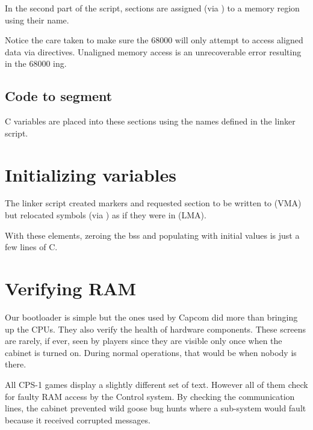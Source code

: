 

In the second part of the script, sections are assigned (via \textbf{\red{\textgreater}}) to a memory region using their  name.

\begin{trivia}
Notice the care taken to make sure the 68000 will only attempt to access aligned data via  directives. Unaligned memory access is an unrecoverable error resulting in the 68000 ing.
\end{trivia}


\subsection{Code to segment}

C variables are placed into these sections using the names defined in the linker script.





\section{Initializing variables}
The linker script created markers and requested section  to be written to  (VMA) but relocated symbols (via \textbf{}) as if they were in  (LMA).

With these elements, zeroing the bss and populating  with initial values is just a few lines of C.



\pagebreak
\section{Verifying RAM}
Our bootloader is simple but the ones used by Capcom did more than bringing up the CPUs. They also verify the health of hardware components. These screens are rarely, if ever, seen by players since they are visible only once when the cabinet is turned on. During normal operations, that would be when nobody is there.

All CPS-1 games display a slightly different set of text. However all of them check for faulty RAM access by the Control system. By checking the communication lines, the cabinet prevented wild goose bug hunts where a sub-system would fault because it received corrupted messages. 

